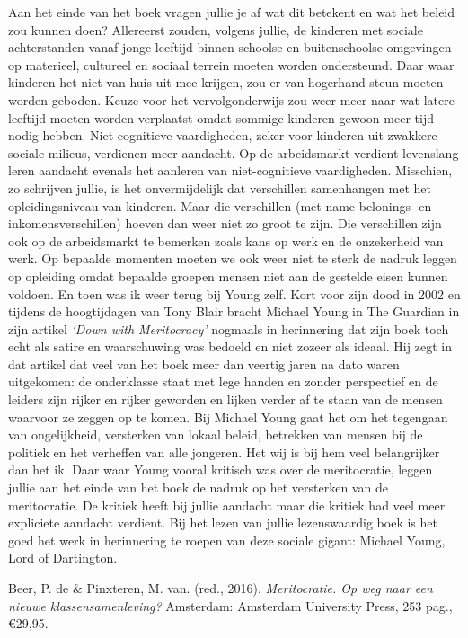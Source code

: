\documentclass[]{book}
\begin{document}
Aan het einde van het boek vragen jullie je af wat dit betekent en wat
het beleid zou kunnen doen? Allereerst zouden, volgens jullie, de
kinderen met sociale achterstanden vanaf jonge leeftijd binnen schoolse
en buitenschoolse omgevingen op materieel, cultureel en sociaal terrein
moeten worden ondersteund. Daar waar kinderen het niet van huis uit mee
krijgen, zou er van hogerhand steun moeten worden geboden. Keuze voor
het vervolgonderwijs zou weer meer naar wat latere leeftijd moeten
worden verplaatst omdat sommige kinderen gewoon meer tijd nodig hebben.
Niet-cognitieve vaardigheden, zeker voor kinderen uit zwakkere sociale
milieus, verdienen meer aandacht. Op de arbeidsmarkt verdient levenslang
leren aandacht evenals het aanleren van niet-cognitieve vaardigheden.
Misschien, zo schrijven jullie, is het onvermijdelijk dat verschillen
samenhangen met het opleidingsniveau van kinderen. Maar die verschillen
(met name belonings- en inkomensverschillen) hoeven dan weer niet zo
groot te zijn. Die verschillen zijn ook op de arbeidsmarkt te bemerken
zoals kans op werk en de onzekerheid van werk. Op bepaalde momenten
moeten we ook weer niet te sterk de nadruk leggen op opleiding omdat
bepaalde groepen mensen niet aan de gestelde eisen kunnen voldoen. En
toen was ik weer terug bij Young zelf. Kort voor zijn dood in 2002 en
tijdens de hoogtijdagen van Tony Blair bracht Michael Young in The
Guardian in zijn artikel \emph{`Down with Meritocracy'} nogmaals in
herinnering dat zijn boek toch echt als satire en waarschuwing was
bedoeld en niet zozeer als ideaal. Hij zegt in dat artikel dat veel van
het boek meer dan veertig jaren na dato waren uitgekomen: de onderklasse
staat met lege handen en zonder perspectief en de leiders zijn rijker en
rijker geworden en lijken verder af te staan van de mensen waarvoor ze
zeggen op te komen. Bij Michael Young gaat het om het tegengaan van
ongelijkheid, versterken van lokaal beleid, betrekken van mensen bij de
politiek en het verheffen van alle jongeren. Het wij is bij hem veel
belangrijker dan het ik. Daar waar Young vooral kritisch was over de
meritocratie, leggen jullie aan het einde van het boek de nadruk op het
versterken van de meritocratie. De kritiek heeft bij jullie aandacht
maar die kritiek had veel meer expliciete aandacht verdient. Bij het
lezen van jullie lezenswaardig boek is het goed het werk in herinnering
te roepen van deze sociale gigant: Michael Young, Lord of Dartington.

Beer, P. de \& Pinxteren, M. van. (red., 2016). \emph{Meritocratie. Op
weg naar een nieuwe klassensamenleving?} Amsterdam: Amsterdam University
Press, 253 pag., €29,95.
\end{document}
